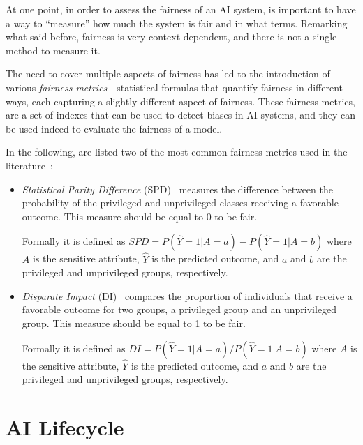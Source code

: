 \documentclass[12pt,a4paper,openright,twoside]{book}
\begin{document}
At one point, in order to assess the fairness of an \ac{AI} system, is important to have a way to ``measure'' how much the system is fair and in what terms.
%
Remarking what said before, fairness is very context-dependent, and there is not a single method to measure it. 


The need to cover multiple aspects of fairness has led to the introduction of various \textit{fairness metrics}---statistical formulas that quantify fairness in different ways, each capturing a slightly different aspect of fairness.
%
These fairness metrics, are a set of indexes that can be used to detect biases in \ac{AI} systems, and they can be used indeed to evaluate the fairness of a model.
%


In the following, are listed two of the most common fairness metrics used in the literature~\cite{DBLP:conf/bias/IrfanML23}:

\begin{itemize}
    \item \textit{Statistical Parity Difference} (SPD)~\cite{fairness-through-awareness}
    measures the difference between the probability of the privileged and unprivileged classes receiving a favorable outcome. This measure should be equal to 0 to be fair.
    
    Formally it is defined as $SPD = P(\hat{Y} = 1 | A = a) - P(\hat{Y} = 1 | A = b)$
    where $A$ is the sensitive attribute, $\hat{Y}$ is the predicted outcome, and $a$ and $b$ are the privileged and unprivileged groups, respectively.
    
    \item \textit{Disparate Impact} (DI)~\cite{disparate-impact}
    compares the proportion of individuals that receive a favorable outcome for two groups, a privileged group and an unprivileged group. This measure should be equal to 1 to be fair.
    
    Formally it is defined as $DI = P(\hat{Y} = 1 | A = a) / P(\hat{Y} = 1 | A = b)$
    where $A$ is the sensitive attribute, $\hat{Y}$ is the predicted outcome, and $a$ and $b$ are the privileged and unprivileged groups, respectively.    
\end{itemize}


\section{\acs{AI} Lifecycle}
\end{document}
